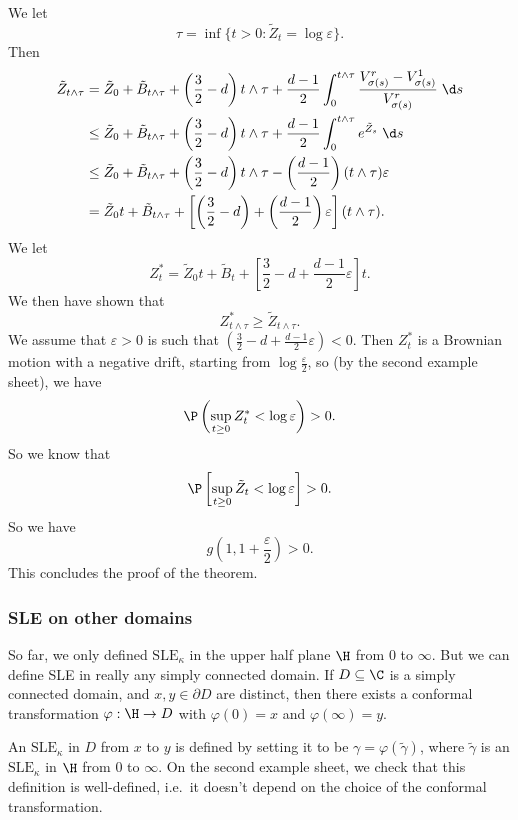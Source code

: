 \documentclass[a4paper]{article}
\newcommand\SLE{\mathrm{SLE}}
\begin{document}
We let
\[
  \tau = \inf \{t > 0 : \tilde{Z}_t = \log \varepsilon\}.
\]
Then
\begin{align*}
  \tilde{Z}_{t \wedge \tau} &= \tilde{Z}_0 + \tilde{B}_{t \wedge \tau} + \left(\frac{3}{2} - d\right) t\wedge \tau + \frac{d - 1}{2} \int_0^{t \wedge \tau} \frac{V_{\sigma(s)}^r - V_{\sigma(s)}^1}{V_{\sigma(s)}^r}\;\d s\\
  &\leq \tilde{Z}_0 + \tilde{B}_{t \wedge \tau} + \left(\frac{3}{2} - d \right) t \wedge \tau + \frac{d - 1}{2} \int_0^{t \wedge \tau} e^{\tilde{Z}_s}\;\d s\\
  &\leq \tilde{Z}_0 + \tilde{B}_{t \wedge \tau} + \left(\frac{3}{2} - d \right) t \wedge \tau - \left(\frac{d - 1}{2}\right)(t \wedge \tau)\varepsilon\\
  &= \tilde{Z}_0t + \tilde{B}_{t \wedge \tau} + \left[\left(\frac{3}{2} - d\right) + \left(\frac{d - 1}{2}\right)\varepsilon \right] (t \wedge \tau).
\end{align*}
We let
\[
  Z_t^*= \tilde{Z}_0t + \tilde{B}_{t} + \left[\frac{3}{2} - d + \frac{d - 1}{2}\varepsilon \right] t.
\]
We then have shown that
\[
  Z_{t \wedge \tau}^* \geq \tilde{Z}_{t \wedge \tau}.
\]
We assume that $\varepsilon > 0$ is such that $\left(\frac{3}{2} - d + \frac{d - 1}{2} \varepsilon\right) < 0$. Then $Z_t^*$ is a Brownian motion with a negative drift, starting from $\log \frac{\varepsilon}{2}$, so (by the second example sheet), we have
\[
  \P \left(\sup_{t \geq 0} Z_t^* < \log \varepsilon\right) > 0.
\]
So we know that
\[
  \P\left[ \sup_{t \geq 0} \tilde{Z}_t < \log \varepsilon \right] > 0.
\]
So we have
\[
  g\left(1, 1 + \frac{\varepsilon}{2}\right) > 0.
\]
This concludes the proof of the theorem.

\subsubsection*{SLE on other domains}
So far, we only defined $\SLE_\kappa$ in the upper half plane $\H$ from $0$ to $\infty$. But we can define SLE in really any simply connected domain. If $D \subseteq \C$ is a simply connected domain, and $x, y \in \partial D$ are distinct, then there exists a conformal transformation $\varphi: \H \to D$ with $\varphi(0) = x$ and $\varphi(\infty) = y$.

An $\SLE_\kappa$ in $D$ from $x$ to $y$ is defined by setting it to be $\gamma = \varphi(\tilde{\gamma})$, where $\tilde{\gamma}$ is an $\SLE_\kappa$ in $\H$ from $0$ to $\infty$. On the second example sheet, we check that this definition is well-defined, i.e.\ it doesn't depend on the choice of the conformal transformation.
\end{document}
